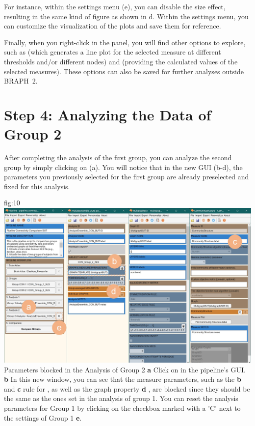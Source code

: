 \documentclass[justified]{tufte-handout}
\begin{document}
For instance, within the settings menu (e), you can disable the size effect, resulting in the same kind of figure as shown in d. Within the settings menu, you can customize the visualization of the plots and save them for reference.

Finally, when you right-click in the  panel, you will find other options to explore, such as  (which generates a line plot for the selected measure at different thresholds and/or different nodes) and  (providing the calculated values of the selected measures). These options can also be saved for further analyses outside BRAPH~2.

\section{Step 4: Analyzing the Data of Group 2}

After completing the analysis of the first group, you can analyze the second group by simply clicking on  (a). You will notice that in the new GUI (b-d), the parameters you previously selected for the first group are already preselected and fixed for this analysis. 

{fig:10}
{
	\includegraphics{fig10.jpg}
}
{Parameters blocked in the Analysis of Group 2}
{
	{\bf a} Click on  in the pipeline's GUI.
	{\bf b} In this new window, you can see that the measure parameters, such as the {\bf b}  and {\bf c} rule for , as well as the graph property {\bf d} , are blocked since they should be the same as the ones set in the analysis of group 1. You can reset the analysis parameters for Group 1 by clicking on the checkbox marked with a 'C' next to the settings of Group 1 {\bf e}.
}
\end{document}
